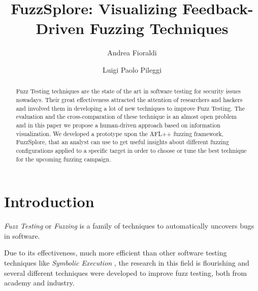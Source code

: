 \documentclass[conference,compsoc]{IEEEtran}
\begin{document}
\title{FuzzSplore: Visualizing Feedback-Driven Fuzzing Techniques}

\author[1]{Andrea Fioraldi}
\author[1]{Luigi Paolo Pileggi}

\maketitle

\begin{abstract}
Fuzz Testing techniques are the state of the art in software testing for security issues nowadays.
Their great effectiveness attracted the attention of researchers and hackers and involved them in developing a lot of new techniques to improve Fuzz Testing.
The evaluation and the cross-comparation of these technique is an almost open problem and in this paper we propose a human-driven approach based on information visualization.
We developed a prototype upon the {\sc AFL++} fuzzing framework, {\sc FuzzSplore}, that an analyst can use to get useful insights about different fuzzing configurations applied to a specific target in order to choose or tune the best technique for the upcoming fuzzing campaign.
\end{abstract}

\section{Introduction}

{\em Fuzz Testing} or {\em Fuzzing} is a family of techniques to automatically uncovers bugs in software.

Due to its effectiveness, much more efficient than other software testing techniques like {\it Symbolic Execution} \cite{redqueen} \cite{sebastian}, the research in this field is flourishing and several different techniques were developed to improve fuzz testing, both from academy and industry.
\end{document}
